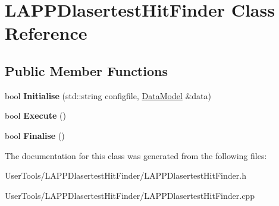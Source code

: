 \hypertarget{classLAPPDlasertestHitFinder}{
\section{LAPPDlasertestHitFinder Class Reference}
\label{classLAPPDlasertestHitFinder}
}
\subsection*{Public Member Functions}
\begin{DoxyCompactItemize}
\item 
\hypertarget{classLAPPDlasertestHitFinder_a0a4dd1a750223833c9eb520008d4f821}{
bool {\bfseries Initialise} (std::string configfile, \hyperlink{classDataModel}{DataModel} \&data)}
\label{classLAPPDlasertestHitFinder_a0a4dd1a750223833c9eb520008d4f821}

\item 
\hypertarget{classLAPPDlasertestHitFinder_a028ed1741a9dd6048638a8e6f95f718a}{
bool {\bfseries Execute} ()}
\label{classLAPPDlasertestHitFinder_a028ed1741a9dd6048638a8e6f95f718a}

\item 
\hypertarget{classLAPPDlasertestHitFinder_a0ca3d1db237531ab1954a79f4ae469bd}{
bool {\bfseries Finalise} ()}
\label{classLAPPDlasertestHitFinder_a0ca3d1db237531ab1954a79f4ae469bd}

\end{DoxyCompactItemize}


The documentation for this class was generated from the following files:\begin{DoxyCompactItemize}
\item 
UserTools/LAPPDlasertestHitFinder/LAPPDlasertestHitFinder.h\item 
UserTools/LAPPDlasertestHitFinder/LAPPDlasertestHitFinder.cpp\end{DoxyCompactItemize}
